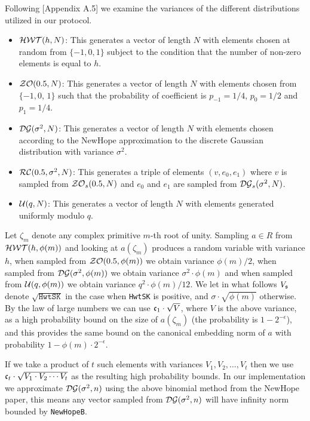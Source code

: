 Following \cite{GHS12c}[Appendix A.5] we examine the variances
of the different distributions utilized in our protocol.
\begin{itemize}
\item $\mathcal{HWT}(h,N)$: This generates a vector of length $N$
      with elements chosen at random from $\{-1,0,1\}$ subject to
      the condition that the number of non-zero elements is equal to $h$.
\item $\mathcal{ZO}(0.5,N)$:  This generates a vector of length $N$
      with elements chosen from $\{-1,0$, $1\}$ such that the
      probability of coefficient is $p_{-1}=1/4$, $p_0=1/2$
      and $p_1=1/4$.
\item $\mathcal{DG}(\sigma^2,N)$: This generates a vector of
      length $N$ with elements chosen according to the NewHope 
      approximation to the discrete Gaussian distribution with variance $\sigma^2$.
\item $\mathcal{RC}(0.5,\sigma^2,N)$: This generates a triple of
      elements $(v,e_0,e_1)$ where $v$ is sampled from $\mathcal{ZO}_s(0.5,N)$
      and $e_0$ and $e_1$ are sampled from $\mathcal{DG}_s(\sigma^2,N)$.
\item $\mathcal{U}(q,N)$: This generates a vector of length $N$ 
      with elements generated uniformly modulo $q$.
\end{itemize}
Let $\zeta_m$ denote any complex primitive $m$-th root of unity.
Sampling $a \in R$ from $\mathcal{HWT}(h,\phi(m))$ and looking at $a(\zeta_m)$
produces a random variable with variance $h$, when sampled
from $\mathcal{ZO}(0.5,\phi(m))$ we obtain variance $\phi(m)/2$,
when sampled from $\mathcal{DG}(\sigma^2,\phi(m))$ we obtain variance
$\sigma^2 \cdot \phi(m)$ and when sampled from $\mathcal{U}(q,\phi(m))$
we obtain variance $q^2 \cdot \phi(m)/12$.
We let in what follows $V_{\mathfrak{s}}$ denote $\sqrt{\texttt{HwtSK}}$ in the case 
when \verb|HwtSK| is positive, and $\sigma \cdot \sqrt{\phi(m)}$ otherwise.
By the law of large numbers we can use $\mathfrak{c}_1 \cdot \sqrt{V}$,
where $V$ is the above variance, as a high probability bound
on the size of $a(\zeta_m)$ (the probability is $1-2^{-\epsilon}$), 
and this provides the same bound on the canonical embedding norm of $a$
with probability $1- \phi(m) \cdot 2^{-\epsilon}$.

If we take a product of $t$ such
elements with variances $V_1, V_2, \ldots, V_t$
then we use $\mathfrak{c}_t \cdot \sqrt{V_1 \cdot V_2 \cdots V_t}$
as the resulting high probability bounds.
In our implementation we approximate $\mathcal{DG}(\sigma^2,n)$ using
the above binomial method from the NewHope paper, this means
any vector sampled from $\mathcal{DG}(\sigma^2,n)$ will have
infinity norm bounded by \verb+NewHopeB+.


